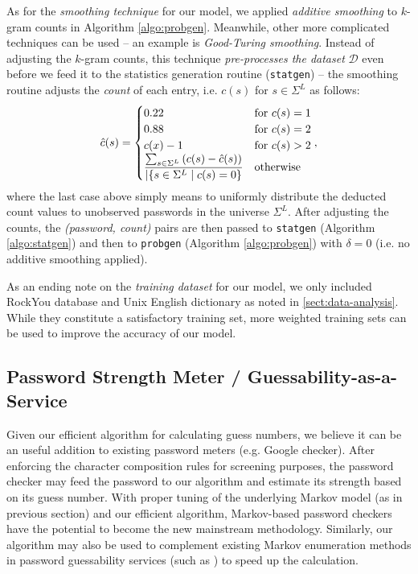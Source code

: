 \documentclass{article} %
\theoremstyle{definition}
\theoremstyle{theorem}
\theoremstyle{remark}
\theoremstyle{remark}
\begin{document}
\par\quad As for the \emph{smoothing technique} for our model, we applied \emph{additive smoothing} to $k$-gram counts in Algorithm \ref{algo:probgen}. Meanwhile, other more complicated techniques can be used -- an example is \emph{Good-Turing smoothing}. Instead of adjusting the $k$-gram counts, this technique \emph{pre-processes the dataset} $\mathcal{D}$ even before we feed it to the statistics generation routine (\texttt{statgen}) -- the smoothing routine adjusts the \emph{count} of each entry, i.e. $c(s)$ for $s\in\Sigma^L$ as follows:
\vspace{-5pt}
$$\hat{c}(s) = \begin{cases}
             0.22       & \text{for } c(s) = 1  \\
             0.88       & \text{for } c(s) = 2  \\
             c(x) - 1   & \text{for } c(s) > 2  \\
             \dfrac{\sum_{s\in\Sigma^L}{(c(s) - \hat{c}(s))}}{|\{s\in\Sigma^L \mid {c(s)=0}\}}  & \text{otherwise}
         \end{cases},\vspace{-1pt}
$$
where the last case above simply means to uniformly distribute the deducted count values to unobserved passwords in the universe $\Sigma^L$. After adjusting the counts, the \emph{(password, count)} pairs are then passed to \texttt{statgen} (Algorithm \ref{algo:statgen}) and then to \texttt{probgen} (Algorithm \ref{algo:probgen}) with $\delta = 0$ (i.e. no additive smoothing applied).

\par\quad As an ending note on the \emph{training dataset} for our model, we only included RockYou database and Unix English dictionary as noted in \ref{sect:data-analysis}. While they constitute a satisfactory training set, more weighted training sets can be used to improve the accuracy of our model.

\subsection{Password Strength Meter / Guessability-as-a-Service}
\par\quad Given our efficient algorithm for calculating guess numbers, we believe it can be an useful addition to existing password meters (e.g. Google checker). After enforcing the character composition rules for screening purposes, the password checker may feed the password to our algorithm and estimate its strength based on its guess number. With proper tuning of the underlying Markov model (as in previous section) and our efficient algorithm, Markov-based password checkers have the potential to become the new mainstream methodology. Similarly, our algorithm may also be used to complement existing Markov enumeration methods in password guessability services (such as \cite{cmu-guessability}) to speed up the calculation.
\end{document}
